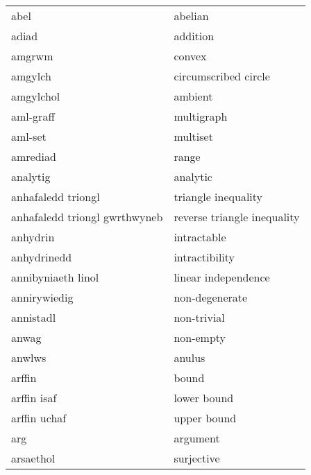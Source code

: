 \begin{supertabular}{p{0.22\textwidth}p{0.22\textwidth}}
                            abel &                           abelian \\
                           adiad &                          addition \\
                          amgrwm &                            convex \\
                         amgylch &              circumscribed circle \\
                       amgylchol &                           ambient \\
                       aml-graff &                        multigraph \\
                         aml-set &                          multiset \\
                        amrediad &                             range \\
                        analytig &                          analytic \\
              anhafaledd triongl &               triangle inequality \\
   anhafaledd triongl gwrthwyneb &       reverse triangle inequality \\
                        anhydrin &                       intractable \\
                     anhydrinedd &                    intractibility \\
              annibyniaeth linol &               linear independence \\
                    annirywiedig &                    non-degenerate \\
                       annistadl &                       non-trivial \\
                           anwag &                         non-empty \\
                          anwlws &                            anulus \\
                          arffin &                             bound \\
                     arffin isaf &                       lower bound \\
                    arffin uchaf &                       upper bound \\
                             arg &                          argument \\
                       arsaethol &                        surjective \\

\end{supertabular}
